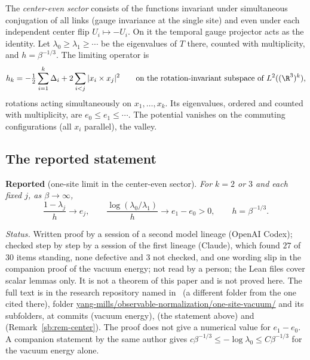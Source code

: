 The \emph{center-even sector} consists of the functions invariant under simultaneous conjugation of all
links (gauge invariance at the single site) and even under each independent center flip
$U_i\mapsto-U_i$. On it the temporal gauge projector acts as the identity. Let
$\lambda_0\ge\lambda_1\ge\cdots$ be the eigenvalues of $T$ there, counted with multiplicity, and
$h=\beta^{-1/3}$. The limiting operator is
\[
h_k=-\tfrac12\sum_{i=1}^k\Delta_i+2\sum_{i<j}|x_i\times x_j|^2
\qquad\text{on the rotation-invariant subspace of }L^2((\R^3)^k),
\]
rotations acting simultaneously on $x_1,\dots,x_k$. Its eigenvalues, ordered and counted with
multiplicity, are $e_0\le e_1\le\cdots$. The potential vanishes on the commuting configurations
(all $x_i$ parallel), the valley.

\subsection{The reported statement}

\medskip\noindent\textbf{Reported} (one-site limit in the center-even sector). \emph{For $k=2$ or $3$ and
each fixed $j$, as $\beta\to\infty$,}
\[
\frac{1-\lambda_j}{h}\longrightarrow e_j,\qquad
\frac{\log(\lambda_0/\lambda_1)}{h}\longrightarrow e_1-e_0>0,\qquad h=\beta^{-1/3}.
\]

\noindent\emph{Status.} Written proof by a session of a second model lineage (OpenAI Codex);
checked step by step by a session of the first lineage (Claude), which found $27$ of $30$ items
standing, none defective and $3$ not checked, and one wording slip in the companion proof of the vacuum
energy; not read by a person; the Lean files cover scalar lemmas only. It is not a theorem of this paper and is
not proved here. The full text is in the research repository named in~\cite{Repo} (a different folder from
the one cited there), folder \url{yang-mills/observable-normalization/one-site-vacuum/} and its
subfolders, at commits  (vacuum energy),  (the statement above) and
 (Remark~\ref{sb:rem-center}).
The proof does not give a numerical value for $e_1-e_0$. A companion statement by the same author
gives $c\beta^{-1/3}\le-\log\lambda_0\le C\beta^{-1/3}$ for the vacuum energy alone.

